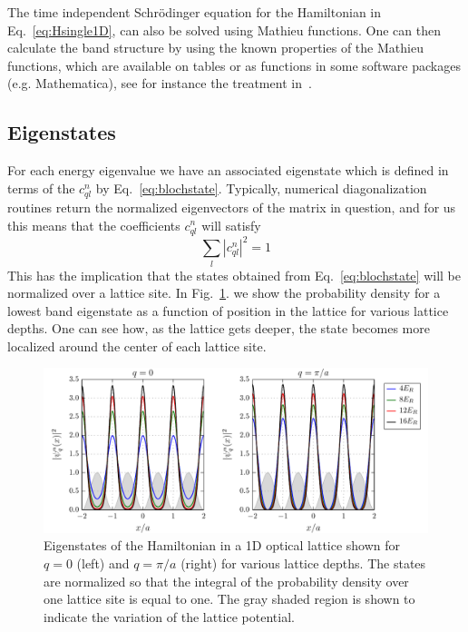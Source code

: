 The time independent Schr\"{o}dinger equation for the Hamiltonian in
Eq.~\ref{eq:Hsingle1D}, can also be solved using Mathieu functions.  One can
then calculate the band structure by using the known properties of the Mathieu
functions, which are available on tables or as functions in some software
packages (e.g. Mathematica), see for instance the treatment
in~\cite{PhysRev.87.807}. 

\subsection{Eigenstates}
For each energy eigenvalue we have an associated eigenstate  which is defined
in terms of the $c_{ql}^{n}$ by Eq.~\ref{eq:blochstate}.   Typically, numerical
diagonalization routines return the normalized eigenvectors of the matrix in
question,  and for us this means that the coefficients $c_{ql}^{n}$ will
satisfy
\begin{equation}
   \sum_{l} | c_{ql}^{n} |^{2} = 1 
\end{equation} 
This has the implication that the states obtained from Eq.~\ref{eq:blochstate}
will be normalized over a lattice site.  In Fig.~\ref{fig:eigenfuns1d}. we show
the probability density for a lowest band eigenstate as a function of position
in the lattice for various lattice depths.  One can see how, as the lattice
gets deeper, the state becomes more localized around the center of each lattice
site. 
\begin{figure}
\centering \includegraphics[width=\textwidth]{../figures/BandStructure_figures/eigenfuns1d.pdf}
\caption[Eigenstates in 1D lattice.]{\small Eigenstates of the Hamiltonian in a
1D optical lattice shown for $q=0$ (left) and $q=\pi/a$ (right) for various
lattice depths. The states are normalized so that the integral of the
probability density over one lattice site is equal to one.  The gray shaded
region is shown to indicate the variation of the lattice potential. }
\label{fig:eigenfuns1d}
\end{figure}

